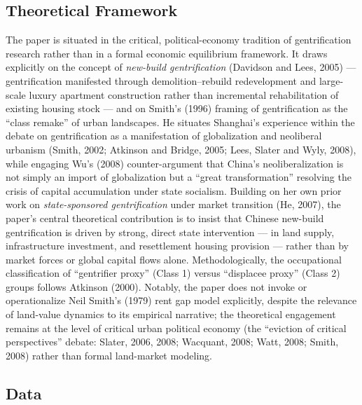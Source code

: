 \subsection*{Theoretical Framework}

The paper is situated in the critical, political-economy tradition of gentrification research rather than in a formal economic equilibrium framework. It draws explicitly on the concept of \emph{new-build gentrification} (Davidson and Lees, 2005) --- gentrification manifested through demolition--rebuild redevelopment and large-scale luxury apartment construction rather than incremental rehabilitation of existing housing stock --- and on Smith's (1996) framing of gentrification as the ``class remake'' of urban landscapes. He situates Shanghai's experience within the debate on gentrification as a manifestation of globalization and neoliberal urbanism (Smith, 2002; Atkinson and Bridge, 2005; Lees, Slater and Wyly, 2008), while engaging Wu's (2008) counter-argument that China's neoliberalization is not simply an import of globalization but a ``great transformation'' resolving the crisis of capital accumulation under state socialism. Building on her own prior work on \emph{state-sponsored gentrification} under market transition (He, 2007), the paper's central theoretical contribution is to insist that Chinese new-build gentrification is driven by strong, direct state intervention --- in land supply, infrastructure investment, and resettlement housing provision --- rather than by market forces or global capital flows alone. Methodologically, the occupational classification of ``gentrifier proxy'' (Class 1) versus ``displacee proxy'' (Class 2) groups follows Atkinson (2000). Notably, the paper does not invoke or operationalize Neil Smith's (1979) rent gap model explicitly, despite the relevance of land-value dynamics to its empirical narrative; the theoretical engagement remains at the level of critical urban political economy (the ``eviction of critical perspectives'' debate: Slater, 2006, 2008; Wacquant, 2008; Watt, 2008; Smith, 2008) rather than formal land-market modeling.

\subsection*{Data}

